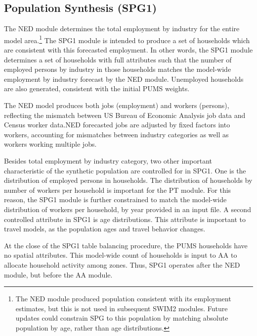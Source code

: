 \subsection{Population Synthesis (SPG1)}
The NED module determines the total employment by industry for the entire model area.\footnote{The NED module produced population consistent with its employment estimates, but this is not used in subsequent SWIM2 modules. Future updates could constrain SPG to this population by matching absolute population by age, rather than age distributions.} The SPG1 module is intended to produce a set of households which are consistent with this forecasted employment. In other words, the SPG1 module determines a set of households with full attributes such that the number of employed persons by industry in those households matches the model-wide employment by industry forecast by the NED module. Unemployed households are also generated, consistent with the initial PUMS weights.

The NED model produces both jobs (employment) and workers (persons), reflecting the mismatch between US Bureau of Economic Analysis job data and Census worker data.NED forecasted jobs are adjusted by fixed factors into workers, accounting for mismatches between industry categories as well as workers working multiple jobs.

Besides total employment by industry category, two other important characteristic of the synthetic population are controlled for in SPG1. One is the distribution of employed persons in households. The distribution of households by number of workers per household is important for the PT module. For this reason, the SPG1 module is further constrained to match the model-wide distribution of workers per household, by year provided in an input file. A second controlled attribute in SPG1 is age distributions. This attribute is important to travel models, as the population ages and travel behavior changes.

At the close of the SPG1 table balancing procedure, the PUMS households have no spatial attributes. This model-wide count of households is input to AA to allocate household activity among zones. Thus, SPG1 operates after the NED module, but before the AA module.

